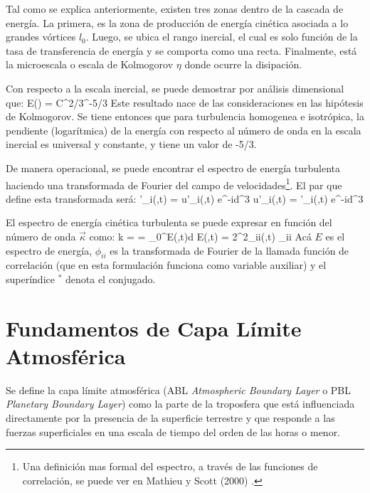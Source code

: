 Tal como se explica anteriormente, existen tres zonas dentro de la cascada de energía. La primera, es la zona de producción de energía cinética asociada a lo grandes vórtices $l_0$. Luego, se ubica el rango inercial, el cual es solo función de la tasa de transferencia de energía y se comporta como una recta. Finalmente, está la microescala o escala de Kolmogorov $\eta$ donde ocurre la disipación.

Con respecto a la escala inercial, se puede demostrar por análisis dimensional que:
\be E(\kappa) = C\varepsilon^{2/3}\kappa^{-5/3} \ee
Este resultado nace de las consideraciones en las hipótesis de Kolmogorov. Se tiene entonces que para turbulencia homogenea e isotrópica, la pendiente (logarítmica) de la energía con respecto al número de onda en la escala inercial es universal y constante, y tiene un valor de -5/3.

De manera operacional, se puede encontrar el espectro de energía turbulenta haciendo una transformada de Fourier del campo de velocidades\footnote{Una definición mas formal del espectro, a través de las funciones de correlación, se puede ver en Mathieu y Scott (2000) \cite{9780521775380}.}. El par que define esta transformada será:
\be {}'_i(\vec{\kappa},t) = \int u'_i(,t) e^{-i\vec{\kappa}\cdot{}}d^3 \ee
\be u'_i(,t) = \int {}'_i(\vec{\kappa},t) e^{-i\vec{\kappa}\cdot{}}d^3\vec{\kappa} \ee

El espectro de energía cinética turbulenta se puede expresar en función del número de onda $\vec{\kappa}$ como:
\be 
k =  = \int\limits_0^\infty E(\kappa,t)d\kappa
\ee
\be
E(\kappa,t) = 2\pi\kappa^2\phi_{ii}(\kappa,t)
\ee 
\be 
\phi_{ii} \approx {}
\ee
Acá $E$ es el espectro de energía, $\phi_{ii}$ es la transformada de Fourier de la llamada función de correlación (que en esta formulación funciona como variable auxiliar) y el superíndice $^*$ denota el conjugado.

\newpage 
\section{Fundamentos de Capa Límite Atmosférica}
Se define la capa límite atmosférica (ABL \emph{Atmospheric Boundary Layer} o PBL \emph{Planetary Boundary Layer}) como la parte de la troposfera que está influenciada directamente por la presencia de la superficie terrestre y que responde a las fuerzas superficiales en una escala de tiempo del orden de las horas o menor.


